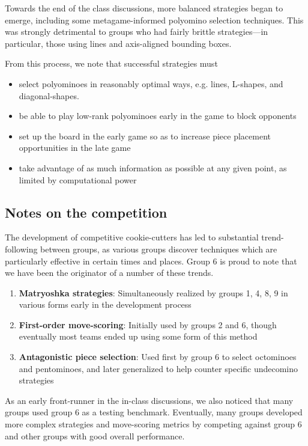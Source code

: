 \documentclass{scrartcl}
\begin{document}
Towards the end of the class discussions, more balanced strategies began to emerge, including some metagame-informed polyomino selection techniques. This was strongly detrimental to groups who had fairly brittle strategies---in particular, those using lines and axis-aligned bounding boxes.

From this process, we note that successful strategies must
\begin{itemize}
\item select polyominoes in reasonably optimal ways, e.g. lines, L-shapes, and diagonal-shapes.
\item be able to play low-rank polyominoes early in the game to block opponents
\item set up the board in the early game so as to increase piece placement opportunities in the late game
\item take advantage of as much information as possible at any given point, as limited by computational power
\end{itemize}

\subsection{Notes on the competition}
The development of competitive cookie-cutters has led to substantial trend-following between groups, as various groups discover techniques which are particularly effective in certain times and places. Group 6 is proud to note that we have been the originator of a number of these trends.

\begin{enumerate}
\item \textbf{Matryoshka strategies}: Simultaneously realized by groups 1, 4, 8, 9 in various forms early in the development process
\item \textbf{First-order move-scoring}: Initially used by groups 2 and 6, though eventually most teams ended up using some form of this method
\item \textbf{Antagonistic piece selection}: Used first by group 6 to select octominoes and pentominoes, and later generalized to help counter specific undecomino strategies
\end{enumerate}

As an early front-runner in the in-class discussions, we also noticed that many groups used group 6 as a testing benchmark. Eventually, many groups developed more complex strategies and move-scoring metrics by competing against group 6 and other groups with good overall performance.
\end{document}
